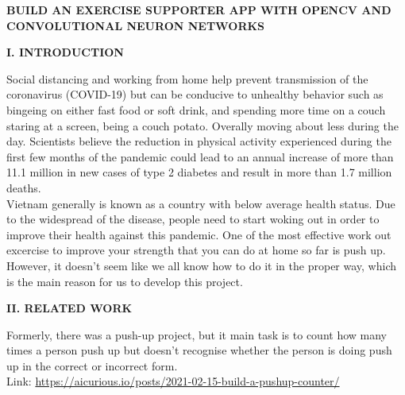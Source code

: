\documentclass[12pt,a4paper,twoside]{article}
\begin{document}
	\begin{center}
		\begin{large}
			\textbf{BUILD AN EXERCISE SUPPORTER APP WITH OPENCV AND CONVOLUTIONAL NEURON NETWORKS}\\
		\end{large}
	\end{center}

	\begin{flushleft}	
		\textbf{I. INTRODUCTION}
			\begin{flushleft}
		Social distancing and working from home help prevent transmission of the coronavirus (COVID-19) but can be conducive to unhealthy behavior such as bingeing on either fast food or soft drink, and spending more time on a couch staring at a screen, being a couch potato. Overally moving about less during the day. Scientists believe the reduction in physical activity experienced during the first few months of the pandemic could lead to an annual increase of more than 11.1 million in new cases of type 2 diabetes and result in more than 1.7 million deaths.\\
		\medskip
		Vietnam generally is known as a country with below average health status. Due to the widespread of the disease, people need to start woking out in order to improve their health against this pandemic. One of the most effective work out excercise to improve your strength that you can do at home so far is push up. However, it doesn't seem like we all know how to do it in the proper way, which is the main reason for us to develop this project.
			\end{flushleft}
	\end{flushleft}

	\begin{flushleft}
		\textbf{II. RELATED WORK}
			\begin{flushleft}
		Formerly, there was a push-up project, but it main task is to count how many times a person push up but doesn't recognise whether the person is doing push up in the correct or incorrect form.\\
		Link: \url{https://aicurious.io/posts/2021-02-15-build-a-pushup-counter/}
			\end{flushleft}
	\end{flushleft}
\end{document}
